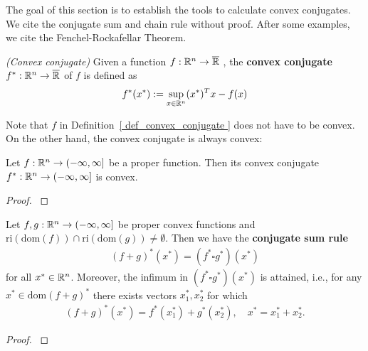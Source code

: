 The goal of this section is to establish the tools to calculate convex conjugates. 
We cite the conjugate sum and chain rule without proof.
After some examples, we cite the Fenchel-Rockafellar Theorem.
\begin{definition}
  \label{cv:cc:d:cc}
  \emph{(Convex conjugate)}
  Given a function
  $
    f:
    \mathbb{R}^n \to \overline{\mathbb{R}}
  $
  ,
  the 
  \textbf{convex conjugate}
  $
    f^*:
    \mathbb{R}^n \to \overline{\mathbb{R}}
  $
  of $f$ is defined as
  \begin{gather}
    f^*(x^*)
    :=
    \sup_{ x \in \mathbb{R}^n }
    (x^*)^T x - f(x)
  \end{gather}
\end{definition}

Note that $f$ in Definition~\ref{ def_convex_conjugate }
does not have to be convex. On the other hand, the convex conjugate is always convex:

\begin{proposition}
  Let  
  $
    f:
    \mathbb{R}^n \to ( - \infty, \infty ]
  $
  be a proper function. 
  Then its convex conjugate
  $
    f^*:
    \mathbb{R}^n \to ( - \infty, \infty ]
  $
  is convex.
\end{proposition}
\begin{proof}
  \cite[Proposition~4.2]{Mordukhovich2022}
\end{proof}



\begin{theorem}
  Let
  $
    f,g:
    \mathbb{R}^n \to (-\infty, \infty]
  $
  be proper convex functions 
  and
  $
  \text{ri}\left( \text{dom}(f) \right)
  \cap
  \text{ri}\left( \text{dom}(g) \right)
  \neq 
  \emptyset
  .
  $
  Then we have the 
  \textbf{
  conjugate sum rule
  }
  \begin{gather}
    ( f + g )^*(x^*)
    =
    ( f^* \square g^*)(x^*)
  \end{gather}
  for all $x^* \in \mathbb{R}^n$.
  Moreover, the infimum in 
  $
    ( f^* \square g^*)(x^*)
  $
  is attained, i.e., for any
  $
    x^* \in \text{dom}(f+g)^*
  $
  there exists vectors $x_1^*, x_2^*$
  for which
  \begin{gather}
    (f+g)^*(x^*)
    =
    f^*(x_1^*)
    +
    g^*(x_2^*),
    \quad
    x^* = x_1^* + x_2^*.
  \end{gather}
\end{theorem}
\begin{proof}
  \cite[Theorem~4.27(c)]{Mordukhovich2022}
\end{proof}



